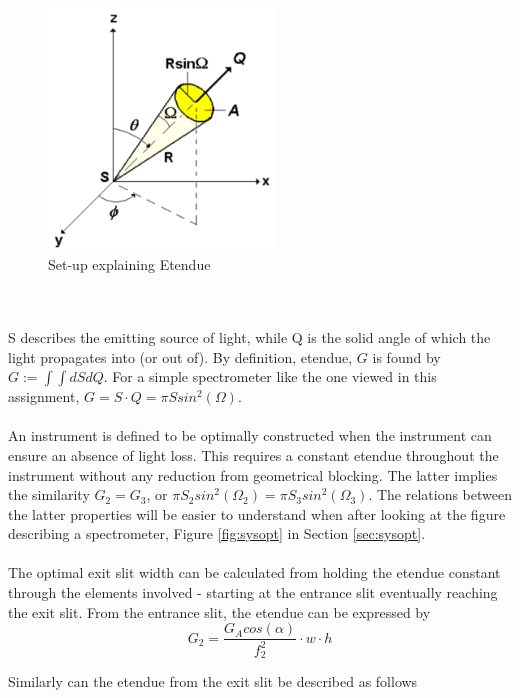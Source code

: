 \begin{figure}[H]
    \centering
    \includegraphics[width = 6cm]{Images/theory/etendue.png}
    \caption{Set-up explaining Etendue}
    \label{fig:etendue}
\end{figure}
\\\\
\noindent
S describes the emitting source of light, while Q is the solid angle of which the light propagates into (or out of). By definition, etendue, $G$ is found by $G := \int\int dS dQ$. For a simple spectrometer like the one viewed in this assignment, $G = S \cdot Q = \pi S sin^2(\Omega)$.
\\\\
An instrument is defined to be optimally constructed when the instrument can ensure an absence of light loss. This requires a constant etendue throughout the instrument without any reduction from geometrical blocking. The latter implies the similarity $G_2 = G_3$, or $\pi S_2 sin^2(\Omega_2) = \pi S_3 sin^2(\Omega_3)$. The relations between the latter properties will be easier to understand when after looking at the figure describing a spectrometer, Figure \ref{fig:sysopt} in Section \ref{sec:sysopt}. 
\\\\
The optimal exit slit width can be calculated from holding the etendue constant through the elements involved - starting at the entrance slit eventually reaching the exit slit. From the entrance slit, the etendue can be expressed by 
\begin{equation}
    G_2 = \frac{G_A cos(\alpha)}{f_2^2} \cdot w \cdot h
    \label{eq:etenentr}
\end{equation}

Similarly can the etendue from the exit slit be described as follows


